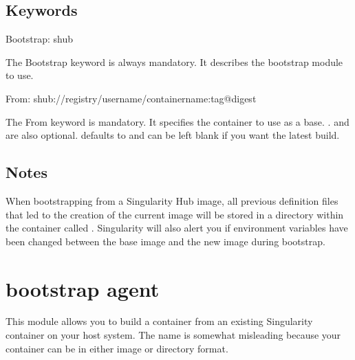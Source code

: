 \documentclass[letterpaper,10pt,english]{sphinxmanual}
\begin{document}
\subsection{Keywords}
\label{\detokenize{appendix:id4}}
%
\begin{sphinxVerbatim}[commandchars=\\\{\}]
Bootstrap: shub
\end{sphinxVerbatim}

The Bootstrap keyword is always mandatory. It describes the bootstrap module to
use.

%
\begin{sphinxVerbatim}[commandchars=\\\{\}]
From: shub://\PYGZlt{}registry\PYGZgt{}/\PYGZlt{}username\PYGZgt{}/\PYGZlt{}container\PYGZhy{}name\PYGZgt{}:\PYGZlt{}tag\PYGZgt{}@digest
\end{sphinxVerbatim}

The From keyword is mandatory. It specifies the container to use as a base.
.  and
 are also optional.  defaults to  and  can
be left blank if you want the latest build.


\subsection{Notes}
\label{\detokenize{appendix:id5}}
When bootstrapping from a Singularity Hub image, all previous definition files
that led to the creation of the current image will be stored in a directory
within the container called . Singularity
will also alert you if environment variables have been changed between the base
image and the new image during bootstrap.


\section{ bootstrap agent}
\label{\detokenize{appendix:localimage-bootstrap-agent}}\label{\detokenize{appendix:build-localimage}}\label{\detokenize{appendix:sec-build-localimage}}
This module allows you to build a container from an existing Singularity
container on your host system. The name is somewhat misleading because your
container can be in either image or directory format.
\end{document}
